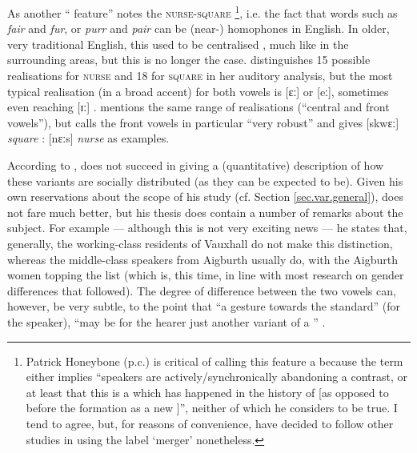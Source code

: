 As another `` feature'' \citet[72]{trudgill1999} notes the \textsc{nurse}-\textsc{square} \footnote{Patrick Honeybone (p.c.) is critical of calling this feature a  because the term either implies \enquote{speakers are actively/synchronically abandoning a contrast, or at least that this is a  which has happened in the history of  [as opposed to before the formation as a new ]}, neither of which he considers to be true. I tend to agree, but, for reasons of convenience, have decided to follow other studies \parencite{trudgill1999,watsonclark2013} in using the label \enquote*{merger} nonetheless.}, i.e. the fact that words such as \emph{fair} and \emph{fur}, or \emph{purr} and \emph{pair} can be (near-) homophones in  English.
In older, very traditional  English, this  used to be centralised \parencite[cf.][323]{west2015}, much like in the surrounding areas, but this is no longer the case.
\citet[cf.][68 and 71]{delyon1981} distinguishes 15 possible realisations for \textsc{nurse} and 18 for \textsc{square} in her auditory analysis, but the most typical realisation (in a broad  accent) for both vowels is [ɛː] or [eː], sometimes even reaching [ɪː] \citep[cf.][358]{watson2007}.
\citet[127]{honeybone2007} mentions the same range of realisations (``central and front vowels''), but calls the front vowels in particular ``very robust'' and gives [skwɛː] \emph{square} : [nɛːs] \emph{nurse} as examples.

According to \citet[358]{watson2007}, \textcite{delyon1981} does not succeed in giving a (quantitative) description of how these variants are socially distributed (as they can be expected to be).
Given his own reservations about the scope of his study (cf. Section \ref{sec.var.general}), \citet{knowles1973} does not fare much better, but his thesis does contain a number of remarks about the subject.
For example --- although this is not very exciting news --- he states that, generally, the working-class residents of Vauxhall do not make this distinction, whereas the middle-class speakers from Aigburth usually do, with the Aigburth women topping the list (which is, this time, in line with most research on gender differences that followed).
The degree of difference between the two vowels can, however, be very subtle, to the point that ``a gesture towards the  standard'' (for the speaker), ``may be for the hearer just another variant of a  '' \citep[cf.][295--297]{knowles1973}.


